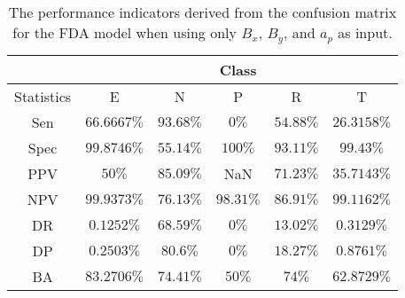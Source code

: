 \begin{table}[!ht]
	\centering
	\begin{tabular}{|c|c|c|c|c|c|}
		\hline
		 & \multicolumn{5}{c|}{Class} \\ \hline
		Statistics & E & N & P & R & T \\ \hline
		Sen & $66.6667\%$ & $93.68\%$ & $0\%$ & $54.88\%$ & $26.3158\%$ \\ \hline
		Spec & $99.8746\%$ & $55.14\%$ & $100\%$ & $93.11\%$ & $99.43\%$ \\ \hline
		PPV & $50\%$ & $85.09\%$ & NaN & $71.23\%$ & $35.7143\%$ \\ \hline
		NPV & $99.9373\%$ & $76.13\%$ & $98.31\%$ & $86.91\%$ & $99.1162\%$ \\ \hline
		DR & $0.1252\%$ & $68.59\%$ & $0\%$ & $13.02\%$ & $0.3129\%$ \\ \hline
		DP & $0.2503\%$ & $80.6\%$ & $0\%$ & $18.27\%$ & $0.8761\%$ \\ \hline
		BA & $83.2706\%$ & $74.41\%$ & $50\%$ & $74\%$ & $62.8729\%$ \\ \hline
	\end{tabular}
	\caption{The performance indicators derived from the confusion matrix for the FDA model when using only $B_{x}$, $B_{y}$, and $a_{p}$ as input.}
	\label{tab:cs:reverse:xyap:fda}
\end{table}
